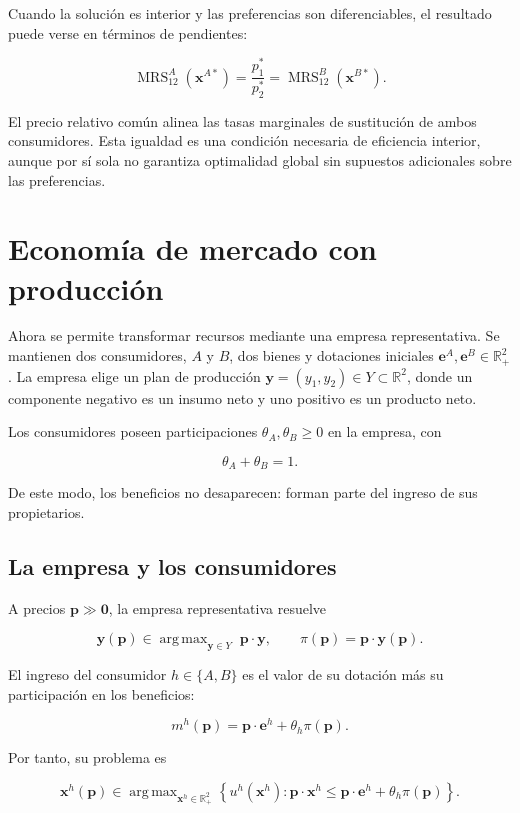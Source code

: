 \documentclass[12pt]{article}
\theoremstyle{cideplain}
\theoremstyle{cidedef}
\DeclareMathOperator*{\argmax}{arg\,max}
\DeclareMathOperator{\MRS}{MRS}
\newcommand{\R}{\mathbb{R}}
\newcommand{\p}{\bm p}
\newcommand{\e}{\bm e}
\newcommand{\x}{\bm x}
\newcommand{\y}{\bm y}
\begin{document}
Cuando la solución es interior y las preferencias son diferenciables, el resultado puede
verse en términos de pendientes:

\[
  \MRS^{A}_{12}(\x^{A*})
  =
  \frac{p_1^*}{p_2^*}
  =
  \MRS^{B}_{12}(\x^{B*}).
\]

El precio relativo común alinea las tasas marginales de sustitución de ambos consumidores.
Esta igualdad es una condición necesaria de eficiencia interior, aunque por sí sola no
garantiza optimalidad global sin supuestos adicionales sobre las preferencias.

\section{Economía de mercado con producción}

Ahora se permite transformar recursos mediante una empresa representativa. Se mantienen
dos consumidores, \(A\) y \(B\), dos bienes y dotaciones iniciales
\(\e^{A},\e^{B}\in\R_+^2\). La empresa elige un plan de producción
\(\y=(y_1,y_2)\in Y\subset\R^2\), donde un componente negativo es un insumo neto y uno
positivo es un producto neto.

Los consumidores poseen participaciones \(\theta_A,\theta_B\geq 0\) en la empresa, con

\[
  \theta_A+\theta_B=1.
\]

De este modo, los beneficios no desaparecen: forman parte del ingreso de sus propietarios.

\subsection{La empresa y los consumidores}

A precios \(\p\gg\bm 0\), la empresa representativa resuelve

\[
  \y(\p)\in\argmax_{\y\in Y}\;\p\cdot\y,
  \qquad
  \pi(\p)=\p\cdot\y(\p).
\]

El ingreso del consumidor \(h\in\{A,B\}\) es el valor de su dotación más su participación
en los beneficios:

\[
  m^h(\p)
  =
  \p\cdot\e^h+\theta_h\pi(\p).
\]

Por tanto, su problema es

\[
  \x^h(\p)
  \in
  \argmax_{\x^h\in\R_+^2}
  \left\{
    u^h(\x^h):
    \p\cdot\x^h
    \leq
    \p\cdot\e^h+\theta_h\pi(\p)
  \right\}.
\]
\end{document}
